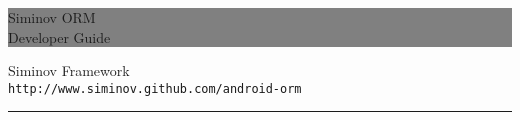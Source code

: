 \documentclass[12pt]{report}
\newcommand{\HRule}[1]{\hfill \rule{0.2\linewidth}{#1}} %
\begin{document}
\thispagestyle{empty} %


\colorbox{grey}{
	\parbox[t]{1.0\linewidth}{
		\centering \fontsize{50pt}{80pt}\selectfont %
		\vspace*{0.7cm} %
		
		\hfill Siminov ORM\\
		\hfill Developer Guide\par
		
		\vspace*{0.7cm} %
	}
}


	\vfill %


	{\centering \large 
\hfill Siminov Framework \\
\hfill \texttt{http://www.siminov.github.com/android-orm} \\

\HRule{1pt}} %


\clearpage %


\noindent
\setcounter{secnumdepth}{3}
\setcounter{tocdepth}{3}


\tableofcontents













\end{document}
